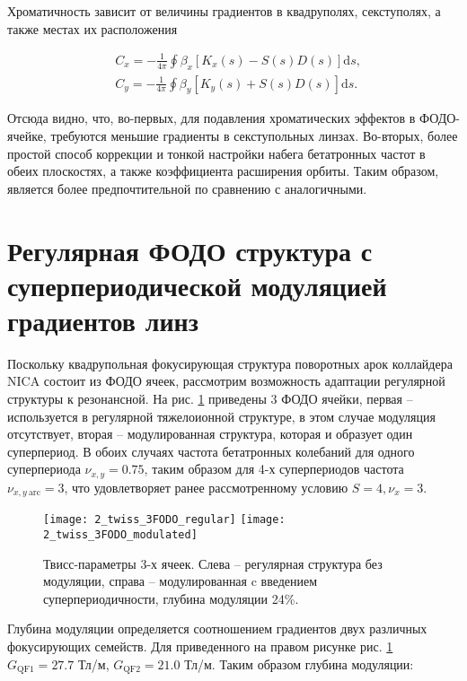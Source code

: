 \noindent Хроматичность зависит от величины градиентов в квадруполях, секступолях, а также местах их расположения \cite{lee}

\begin{equation}
\begin{aligned}
& C_x=-\frac{1}{4 \pi} \oint \beta_x\left[K_x(s)-S(s) D(s)\right] \textrm{d} s, \\
& C_y=-\frac{1}{4 \pi} \oint \beta_y\left[K_y(s)+S(s) D(s)\right] \textrm{d} s.
\end{aligned}
\end{equation}

\noindent Отсюда видно, что, во-первых, для подавления хроматических эффектов в ФОДО-ячейке, требуются меньшие градиенты в секступольных линзах. Во-вторых, более простой способ коррекции и тонкой настройки набега бетатронных частот в обеих плоскостях, а также коэффициента расширения орбиты. Таким образом, является более предпочтительной по сравнению с аналогичными.

	\section{Регулярная ФОДО структура с суперпериодической модуляцией градиентов линз}\label{sec:transition_variation/methods/FODO}

\par Поскольку квадрупольная фокусирующая структура поворотных арок коллайдера NICA состоит из ФОДО ячеек, рассмотрим возможность адаптации регулярной структуры к резонансной. На рис. \ref{fig:twiss_3FODO} приведены 3 ФОДО ячейки, первая – используется в регулярной тяжелоионной структуре, в этом случае модуляция отсутствует, вторая – модулированная структура,  которая и образует один суперпериод. В обоих случаях частота бетатронных колебаний для одного суперпериода $\nu_{x,y}=0.75$, таким образом для 4-х суперпериодов частота $\nu_{x,y\ \text{arc}}=3$, что удовлетворяет ранее рассмотренному условию $S=4, \nu_x=3$.

\begin{figure}[h!]
	\texttt{[image: 2\_twiss\_3FODO\_regular]}
	\texttt{[image: 2\_twiss\_3FODO\_modulated]}
	\caption{Твисс-параметры 3-х ячеек. Слева – регулярная структура без модуляции, справа – модулированная c введением суперпериодичности, глубина модуляции 24\%.}
	\label{fig:twiss_3FODO}
\end{figure}

\noindent Глубина модуляции определяется соотношением градиентов двух различных фокусирующих семейств. Для приведенного на правом рисунке рис. \ref{fig:twiss_3FODO} $G_{\textrm{QF1}}=27.7$ Тл/м, $G_{\textrm{QF2}}=21.0$ Тл/м. Таким образом глубина модуляции:

